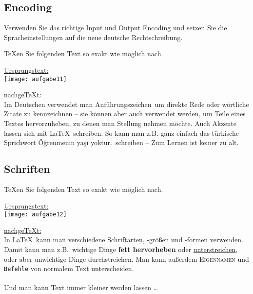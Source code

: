 \subsection{Encoding}
\begin{aufgabe}
Verwenden Sie das richtige Input und Output Encoding und setzen Sie die Spracheinstellungen auf die neue deutsche Rechtschreibung.	
\end{aufgabe}

\begin{aufgabe}
\TeX en Sie folgenden Text so exakt wie m\"oglich nach.	
\end{aufgabe}
\noindent \underline{Ursprungstext:} \\
\noindent\texttt{[image: aufgabe11]}

\noindent \underline{nachge\TeX t:}\\
\singlespacing
\indent Im Deutschen verwendet man \glqq Anführungszeichen\grqq \ um direkte Rede oder wörtliche Zitate zu kennzeichnen -- 
sie können aber auch verwendet werden, um Teile eines Textes hervorzuheben, zu denen man Stellung nehmen möchte.
Auch Akzente lassen sich mit \LaTeX\ schreiben.
So kann man z.B. ganz einfach das türkische Sprichwort \glqq Ö\u{g}renmenin ya\c{s}{\i} yoktur.\grqq \ schreiben  -- 
\glqq Zum Lernen ist keiner zu alt.\grqq

\subsection{Schriften}					%
\begin{aufgabe}
\TeX en Sie folgenden Text so exakt wie m\"oglich nach.	
\end{aufgabe}

\noindent \underline{Ursprungstext:} \\
\noindent\texttt{[image: aufgabe12]}

\noindent \underline{nachge\TeX t:}\\
\indent 
In \LaTeX\ kann man verschiedene Schriftarten, -größen und -formen verwenden.
Damit kann man z.B.\ wichtige Dinge \textbf{fett hervorheben} oder \underline{unterstreichen}, oder aber unwichtige Dinge
\sout{durchstreichen}.
Man kann außerdem \textsc{Eigennamen} und \texttt{Befehle} von normalem Text unterscheiden.
\\
\\
\noindent\hspace*{21mm}
\Huge{Und} \huge{man} \LARGE{kann} \Large{Text} \large{immer} \normalsize{kleiner} \small{werden} \footnotesize{lassen}
\dots

